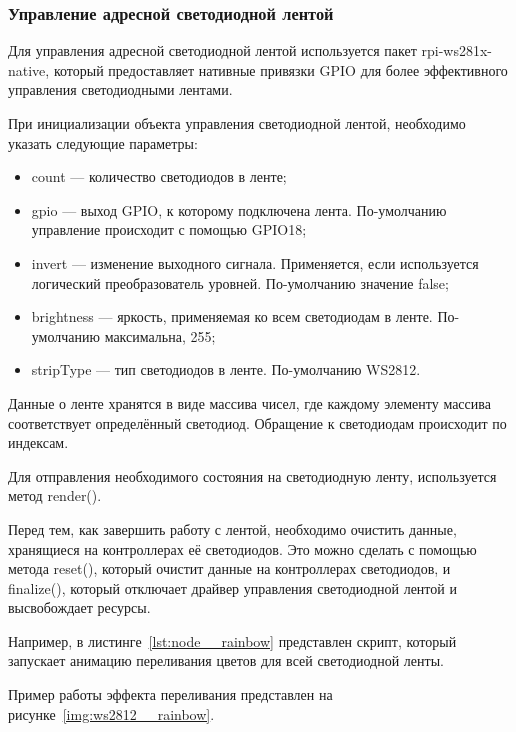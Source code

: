 \subsubsection{Управление адресной светодиодной лентой}

Для управления адресной светодиодной лентой используется пакет rpi-ws281x-native, который предоставляет нативные привязки GPIO для более эффективного управления светодиодными лентами.

При инициализации объекта управления светодиодной лентой, необходимо указать следующие параметры:

\begin{itemize}
  \item count --- количество светодиодов в ленте;
  \item gpio --- выход GPIO, к которому подключена лента. По-умолчанию управление происходит с помощью GPIO18;
  \item invert --- изменение выходного сигнала. Применяется, если используется логический преобразователь уровней. По-умолчанию значение false;
  \item brightness --- яркость, применяемая ко всем светодиодам в ленте. По-умолчанию максимальна, 255;
  \item stripType --- тип светодиодов в ленте. По-умолчанию WS2812.
\end{itemize}

Данные о ленте хранятся в виде массива чисел, где каждому элементу массива соответствует определённый светодиод. Обращение к светодиодам происходит по индексам.

Для отправления необходимого состояния на светодиодную ленту, используется метод render().

Перед тем, как завершить работу с лентой, необходимо очистить данные, хранящиеся на контроллерах её светодиодов. Это можно сделать с помощью метода reset(), который очистит данные на контроллерах светодиодов, и finalize(), который отключает драйвер управления светодиодной лентой и высвобождает ресурсы.

Например, в листинге~\ref{lst:node__rainbow} представлен скрипт, который запускает анимацию переливания цветов для всей светодиодной ленты.



Пример работы эффекта переливания представлен на рисунке~\ref{img:ws2812__rainbow}.

